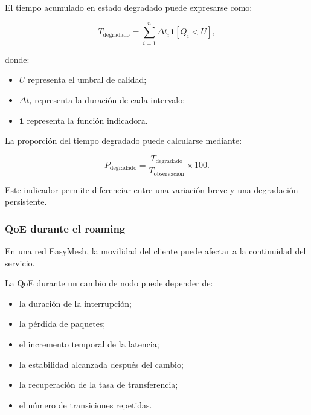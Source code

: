 El tiempo acumulado en estado degradado puede expresarse como:

\[
    T_{\mathrm{degradado}}
    =
    \sum_{i=1}^{n}
    \Delta t_i
    \mathbf{1}
    \left[
        Q_i
        <
        U
    \right],
\]

donde:

\begin{itemize}
    \item \(U\) representa el umbral de calidad;

    \item \(\Delta t_i\) representa la duración de cada intervalo;

    \item \(\mathbf{1}\) representa la función indicadora.
\end{itemize}

La proporción del tiempo degradado puede calcularse mediante:

\[
    P_{\mathrm{degradado}}
    =
    \frac{
        T_{\mathrm{degradado}}
    }{
        T_{\mathrm{observación}}
    }
    \times
    100.
\]

Este indicador permite diferenciar entre una variación breve y una
degradación persistente.


\subsubsection*{QoE durante el roaming}

En una red EasyMesh, la movilidad del cliente puede afectar a la
continuidad del servicio.

La QoE durante un cambio de nodo puede depender de:

\begin{itemize}
    \item la duración de la interrupción;

    \item la pérdida de paquetes;

    \item el incremento temporal de la latencia;

    \item la estabilidad alcanzada después del cambio;

    \item la recuperación de la tasa de transferencia;

    \item el número de transiciones repetidas.
\end{itemize}

